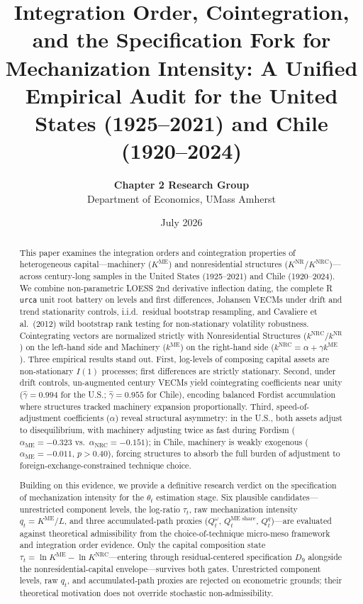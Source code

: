 \documentclass[11pt,a4paper]{article}
\title{\textbf{Integration Order, Cointegration, and the Specification Fork for Mechanization Intensity: A Unified Empirical Audit for the United States (1925--2021) and Chile (1920--2024)}}
\author{\textbf{Chapter 2 Research Group} \\ Department of Economics, UMass Amherst}
\date{July 2026}
\begin{document}
\maketitle

\begin{abstract}
This paper examines the integration orders and cointegration properties of heterogeneous capital---machinery ($K^{\text{ME}}$) and nonresidential structures ($K^{\text{NR}}$/$K^{\text{NRC}}$)---across century-long samples in the United States (1925--2021) and Chile (1920--2024). We combine non-parametric LOESS 2nd derivative inflection dating, the complete R \texttt{urca} unit root battery on levels and first differences, Johansen VECMs under drift and trend stationarity controls, i.i.d.\ residual bootstrap resampling, and Cavaliere et al.\ (2012) wild bootstrap rank testing for non-stationary volatility robustness. Cointegrating vectors are normalized strictly with Nonresidential Structures ($k^{\text{NRC}}$/$k^{\text{NR}}$) on the left-hand side and Machinery ($k^{\text{ME}}$) on the right-hand side ($k^{\text{NRC}} = \alpha + \gamma k^{\text{ME}}$). Three empirical results stand out. First, log-levels of composing capital assets are non-stationary $I(1)$ processes; first differences are strictly stationary. Second, under drift controls, un-augmented century VECMs yield cointegrating coefficients near unity ($\hat{\gamma} = 0.994$ for the U.S.; $\hat{\gamma} = 0.955$ for Chile), encoding balanced Fordist accumulation where structures tracked machinery expansion proportionally. Third, speed-of-adjustment coefficients ($\alpha$) reveal structural asymmetry: in the U.S., both assets adjust to disequilibrium, with machinery adjusting twice as fast during Fordism ($\alpha_{\text{ME}} = -0.323$ vs.\ $\alpha_{\text{NRC}} = -0.151$); in Chile, machinery is weakly exogenous ($\alpha_{\text{ME}} = -0.011$, $p > 0.40$), forcing structures to absorb the full burden of adjustment to foreign-exchange-constrained technique choice.

Building on this evidence, we provide a definitive research verdict on the specification of mechanization intensity for the $\theta_t$ estimation stage. Six plausible candidates---unrestricted component levels, the log-ratio $\tau_t$, raw mechanization intensity $q_t = K^{\text{ME}}/L$, and three accumulated-path proxies ($Q_t^\omega$, $Q_t^{\text{ME share}}$, $Q_t^q$)---are evaluated against theoretical admissibility from the choice-of-technique micro-meso framework and integration order evidence. Only the capital composition state $\tau_t = \ln K^{\text{ME}} - \ln K^{\text{NRC}}$---entering through residual-centered specification $D_9$ alongside the nonresidential-capital envelope---survives both gates. Unrestricted component levels, raw $q_t$, and accumulated-path proxies are rejected on econometric grounds; their theoretical motivation does not override stochastic non-admissibility.
\end{abstract}
\end{document}
